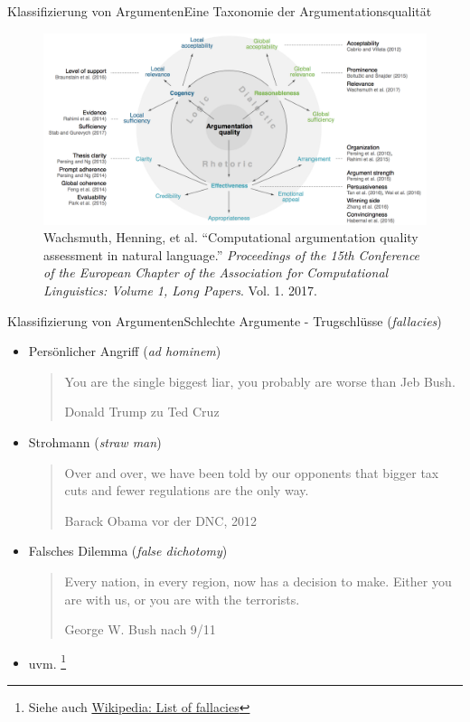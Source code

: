 \documentclass{beamer}
\begin{document}
	\begin{frame}{Klassifizierung von Argumenten}{Eine Taxonomie der Argumentationsqualität}
		\begin{figure}
			\includegraphics[width=\textwidth]{img/discussion-taxonomy}
			\caption{\small Wachsmuth, Henning, et al. ``Computational argumentation quality assessment in natural language.'' \textit{Proceedings of the 15th Conference of the European Chapter of the Association for Computational Linguistics: Volume 1, Long Papers}. Vol. 1. 2017.}
		\end{figure}
	\end{frame}

		\begin{frame}{Klassifizierung von Argumenten}{Schlechte Argumente - Trugschlüsse (\textit{fallacies})}
		\begin{itemize}[<+->]
			\item Persönlicher Angriff (\textit{ad hominem})
			\begin{quote}
				\small You are the single biggest liar, you probably are worse than Jeb Bush.
				\begin{flushright}
					\tiny Donald Trump zu Ted Cruz
				\end{flushright}
			\end{quote}
			\item Strohmann (\textit{straw man})
			\begin{quote}{}
				\small Over and over, we have been told by our opponents that bigger tax cuts and fewer regulations are the only way.
				\begin{flushright}
					\tiny Barack Obama vor der DNC, 2012
				\end{flushright}
			\end{quote}
			\item Falsches Dilemma (\textit{false dichotomy})
			\begin{quote}{}
				\small Every nation, in every region, now has a decision to make. Either you are with us, or you are with the terrorists.
				\begin{flushright}
					\tiny George W. Bush nach 9/11
				\end{flushright}
			\end{quote}
			\item uvm. \footnote{Siehe auch \href{https://en.wikipedia.org/wiki/List_of_fallacies}{Wikipedia: List of fallacies}}
		\end{itemize}
	\end{frame}
\end{document}
